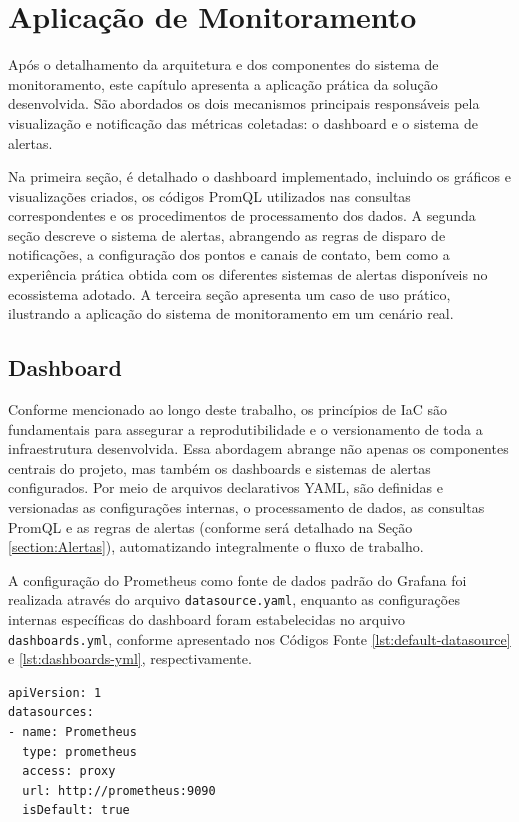 \chapter{Aplicação de Monitoramento}
\label{chap4}

Após o detalhamento da arquitetura e dos componentes do sistema de monitoramento, este capítulo apresenta a aplicação prática da solução desenvolvida. São abordados os dois mecanismos principais responsáveis pela visualização e notificação das métricas coletadas: o dashboard e o sistema de alertas.

Na primeira seção, é detalhado o dashboard implementado, incluindo os gráficos e visualizações criados, os códigos PromQL utilizados nas consultas correspondentes e os procedimentos de processamento dos dados. A segunda seção descreve o sistema de alertas, abrangendo as regras de disparo de notificações, a configuração dos pontos e canais de contato, bem como a experiência prática obtida com os diferentes sistemas de alertas disponíveis no ecossistema adotado. A terceira seção apresenta um caso de uso prático, ilustrando a aplicação do sistema de monitoramento em um cenário real.

\section{Dashboard}
\label{section:Dashboard}

Conforme mencionado ao longo deste trabalho, os princípios de IaC são fundamentais para assegurar a reprodutibilidade e o versionamento de toda a infraestrutura desenvolvida. Essa abordagem abrange não apenas os componentes centrais do projeto, mas também os dashboards e sistemas de alertas configurados. Por meio de arquivos declarativos YAML, são definidas e versionadas as configurações internas, o processamento de dados, as consultas PromQL e as regras de alertas (conforme será detalhado na Seção \ref{section:Alertas}), automatizando integralmente o fluxo de trabalho.

A configuração do Prometheus como fonte de dados padrão do Grafana foi realizada através do arquivo \verb|datasource.yaml|, enquanto as configurações internas específicas do dashboard foram estabelecidas no arquivo \verb|dashboards.yml|, conforme apresentado nos Códigos Fonte \ref{lst:default-datasource} e \ref{lst:dashboards-yml}, respectivamente.

\begin{lstlisting}[caption={Arquivo datasource.yml}, label={lst:default-datasource}]
apiVersion: 1
datasources:
- name: Prometheus
  type: prometheus
  access: proxy
  url: http://prometheus:9090
  isDefault: true
\end{lstlisting}

